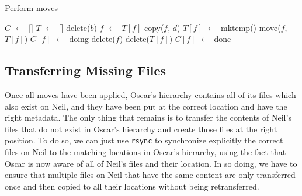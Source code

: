 \documentclass[twoside,envcountsame,runningheads]{llncs}
\newcommand*\Let[2]{\State #1 $\gets$ #2}
\newcommand{\rsync}{\texttt{rsync}\xspace}
\begin{document}
\begin{algorithm}[t]
  \caption{Perform moves}
  \label{alg:moves}
  \begin{algorithmic}[1]
    \Statex
    \Let{$C$}{[]} 
    \Let{$T$}{[]} 
          \State delete($b$) 
        \Else
          \State {} 
        \EndIf
      \EndIf
        \Let{$f$}{$T[f]$}
      \EndIf
      \State copy($f$, $d$)
    \EndFunction
        \State \Return {}
      \EndIf
          \Let{$T[f]$}{mktemp()}
          \State move($f$, $T[f]$)
        \EndIf
        \State \Return {}
      \EndIf
      \Let{$C[f]$}{doing}
        \State {} 
      \EndFor
        \State delete($f$)
      \EndIf
        \State delete($T[f]$)
      \EndIf
      \Let{$C[f]$}{done}
    \EndFunction

      \State {}
    \EndFor
  \end{algorithmic}
\end{algorithm}

\subsection{Transferring Missing Files}
\label{sec:transferring}

Once all moves have been applied, Oscar's hierarchy contains all of its files
which also exist on Neil, and they have been put at the correct location and have the right metadata. The
only thing that remains is to transfer the contents of Neil's files that do not
exist in Oscar's hierarchy and create those files at the right position. To do
so, we can just use \rsync to synchronize explicitly the correct
files on Neil to the matching locations in Oscar's hierarchy, using the fact that
Oscar is now aware of all of Neil's files and their location. In so doing, we have to ensure that multiple files on Neil that have the same content are only transferred once and then copied to all their locations without being retransferred.
\end{document}
